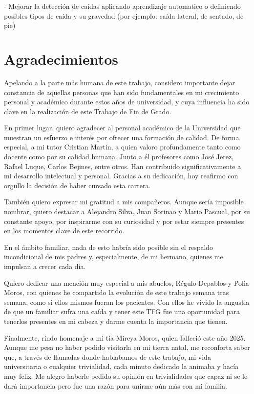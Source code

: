 \documentclass[12pt, a4paper]{article}
\begin{document}
	- Mejorar la detección de caídas aplicando aprendizaje automatico o definiendo posibles tipos de caída y su gravedad (por ejemplo: caída lateral, de sentado, de pie)  


\clearpage
\section*{Agradecimientos}

Apelando a la parte más humana de este trabajo, considero importante dejar constancia de aquellas personas que han sido fundamentales en mi crecimiento personal y acad\'emico durante estos a\~nos de universidad, y cuya influencia ha sido clave en la realizaci\'on de este Trabajo de Fin de Grado.

En primer lugar, quiero agradecer al personal acad\'emico de la Universidad que muestran un esfuerzo e interés por ofrecer una formaci\'on de calidad. De forma especial, a mi tutor Cristian Mart\'in, a quien valoro profundamente tanto como docente como por su calidad humana. Junto a \'el profesores como Jos\'e Jerez, Rafael Luque, Carlos Bejines, entre otros. Han contribuido significativamente a mi desarrollo intelectual y personal. Gracias a su dedicaci\'on, hoy reafirmo con orgullo la decisi\'on de haber cursado esta carrera.

Tambi\'en quiero expresar mi gratitud a mis compa\~neros. Aunque ser\'ia imposible nombrar, quiero destacar a Alejandro Silva, Juan Sorinao y Mario Pascual, por su constante apoyo, por inspirarme con su curiosidad y por estar siempre presentes en los momentos clave de este recorrido.

En el \'ambito familiar, nada de esto habr\'ia sido posible sin el respaldo incondicional de mis padres y, especialmente, de mi hermano, quienes me impulsan a crecer cada d\'ia.

Quiero dedicar una menci\'on muy especial a mis abuelos, R\'egulo Depablos y Polia Moros, con quienes he compartido la evoluci\'on de este trabajo semana tras semana, como si ellos mismos fueran los pacientes. Con ellos he vivido la angustia de que un familiar sufra una caída y tener este TFG fue una oportunidad para tenerlos presentes en mi cabeza y darme cuenta la importancia que tienen.

Finalmente, rindo homenaje a mi t\'ia Mireya Moros, quien falleci\'o este a\~no 2025. Aunque me pesa no haber podido visitarla en mi tierra natal, me reconforta saber que, a trav\'es de llamadas donde hablabamos de este trabajo, mi vida universitaria o cualquier trivialidad, cada minuto dedicado la animaba y hacía muy feliz. Me alegro haberle pedido su opinión en trivialidades que capaz ni se le dará importancia pero fue una razón para unirme aún más con mi familia. 
\end{document}

